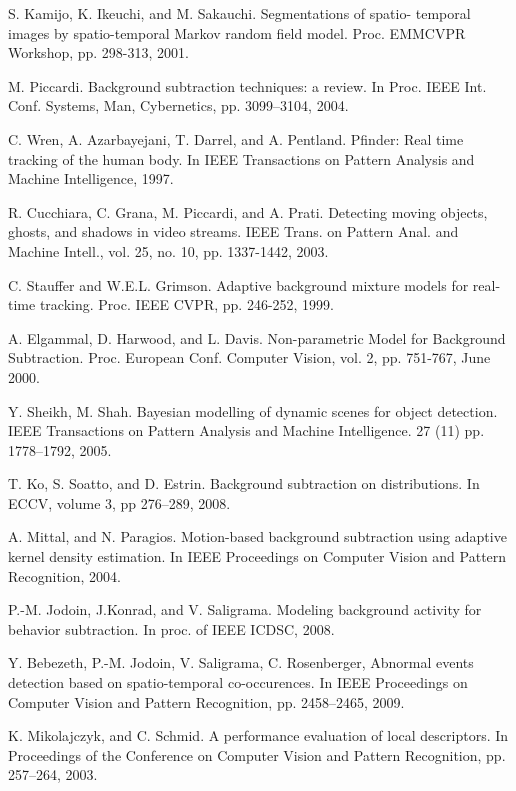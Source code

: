 \documentclass[a4paper,twocolumn, 10pt]{article}
\begin{document}
\begin{thebibliography}{19}

  S. Kamijo, K. Ikeuchi, and M. Sakauchi. Segmentations of spatio- temporal images by spatio-temporal Markov random field model. Proc. EMMCVPR Workshop, pp. 298-313, 2001.

  M. Piccardi. Background subtraction techniques: a review. In Proc. IEEE Int. Conf. Systems, Man, Cybernetics, pp. 3099–3104, 2004.

  C. Wren, A. Azarbayejani, T. Darrel, and A. Pentland. Pfinder: Real time tracking of the human body. In IEEE Transactions on Pattern Analysis and Machine Intelligence, 1997.

  R. Cucchiara, C. Grana, M. Piccardi, and A. Prati. Detecting moving objects, ghosts, and shadows in video streams. IEEE Trans. on Pattern Anal. and Machine Intell., vol. 25, no. 10, pp. 1337-1442, 2003.

  C. Stauffer and W.E.L. Grimson. Adaptive background mixture models for real-time tracking. Proc. IEEE CVPR, pp. 246-252, 1999.

  A. Elgammal, D. Harwood, and L. Davis. Non-parametric Model for Background Subtraction. Proc. European Conf. Computer Vision, vol. 2, pp. 751-767, June 2000.

  Y. Sheikh, M. Shah. Bayesian modelling of dynamic scenes for object detection. IEEE Transactions on Pattern Analysis and Machine Intelligence. 27 (11) pp. 1778–1792, 2005.

  T. Ko, S. Soatto, and D. Estrin. Background subtraction on distributions. In ECCV, volume 3, pp 276–289, 2008.

  A. Mittal, and N. Paragios. Motion-based background subtraction using adaptive kernel density estimation. In IEEE Proceedings on Computer Vision and Pattern Recognition, 2004.

  P.-M. Jodoin, J.Konrad, and V. Saligrama. Modeling background activity for behavior subtraction. In proc. of IEEE ICDSC, 2008.

  Y. Bebezeth, P.-M. Jodoin, V. Saligrama, C. Rosenberger, Abnormal events detection based on spatio-temporal co-occurences. In IEEE Proceedings on Computer Vision and Pattern Recognition, pp. 2458–2465, 2009.

  K. Mikolajczyk, and C. Schmid. A performance evaluation of local descriptors. In Proceedings of the Conference on Computer Vision and Pattern Recognition, pp. 257–264, 2003.


\end{thebibliography}
\end{document}
